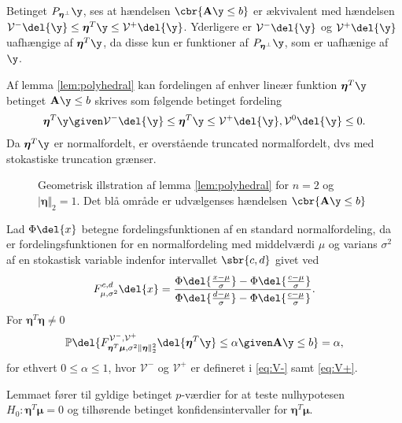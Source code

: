 Betinget \(P_{\boldsymbol{\eta}^\perp} \y\), ses at hændelsen \(\cbr{\mathbf{A} \y \leq b}\) er ækvivalent med hændelsen \(\mathcal{V}^- \del{\y} \leq \boldsymbol{\eta}^T \y \leq \mathcal{V}^+ \del{\y}\). Yderligere er \(\mathcal{V}^- \del{\y}\) og \(\mathcal{V}^+ \del{\y}\) uafhængige af \(\boldsymbol{\eta}^T \y\), da disse kun er funktioner af \(P_{\boldsymbol{\eta}^\perp} \y\), som er uafhænige af \(\y\).


Af lemma \ref{lem:polyhedral} kan fordelingen af enhver lineær funktion \(\boldsymbol{\eta}^T \y\) betinget \(\mathbf{A} \y \leq b\) skrives som følgende betinget fordeling
\begin{align*}
\boldsymbol{\eta}^T \y \given \mathcal{V}^- \del{\y} \leq \boldsymbol{\eta}^T \y \leq \mathcal{V}^+ \del{\y}, \mathcal{V}^0 \del{\y} \leq 0.
\end{align*}
Da \(\boldsymbol{\eta}^T \y\) er normalfordelt, er overstående truncated normalfordelt, dvs med stokastiske truncation grænser.

\begin{figure}[H]
\centering
\scalebox{0.8}{}
\caption{Geometrisk illstration af lemma \ref{lem:polyhedral} for \(n=2\) og \(\vert \boldsymbol{\eta} \Vert_2=1\). 
Det blå område er udvælgenses hændelsen \(\cbr{\mathbf{A} \y \leq b}\)}
\end{figure}


\begin{lem}  \label{lem:lem2}
Lad \(\Phi \del{x}\) betegne fordelingsfunktionen af en standard normalfordeling, da er fordelingsfunktionen for en normalfordeling med middelværdi \(\mu\) og varians \(\sigma^2\) af en stokastisk variable indenfor intervallet \(\sbr{c,d}\) givet ved
\begin{align*}
F_{\mu, \sigma^2}^{c,d} \del{x} = \frac{\Phi\del{\frac{x-\mu}{\sigma}} - \Phi\del{\frac{c-\mu}{\sigma}}}{\Phi\del{\frac{d-\mu}{\sigma}} - \Phi\del{\frac{c-\mu}{\sigma}}}.
\end{align*}
For \(\boldsymbol{\eta}^T \boldsymbol{\eta} \neq 0\)
\begin{align*}
\mathbb{P} \del{F_{\boldsymbol{\eta}^T \boldsymbol{\mu}, \sigma^2 \Vert \boldsymbol{\eta} \Vert_2^2}^{\mathcal{V}^-, \mathcal{V}^+} \del{\boldsymbol{\eta}^T \y} \leq \alpha \given \mathbf{A} \y \leq b} = \alpha, 
\end{align*}
for ethvert \(0 \leq \alpha \leq 1\), hvor \(\mathcal{V}^-\) og \(\mathcal{V}^+\) er defineret i \eqref{eq:V-} samt \eqref{eq:V+}. 
\end{lem}
%
Lemmaet fører til gyldige betinget \(p\)-værdier for at teste nulhypotesen \(H_0: \boldsymbol{\eta}^T \boldsymbol{\mu}=0\) og tilhørende betinget konfidensintervaller for \(\boldsymbol{\eta}^T \boldsymbol{\mu}\).

